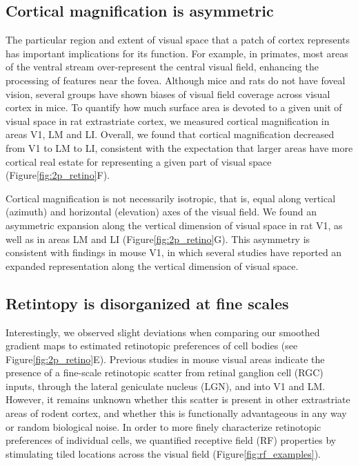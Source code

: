 \subsection{Cortical magnification is asymmetric}
The particular region and extent of visual space that a patch of cortex represents has important implications for its function. For example, in primates, most areas of the ventral stream over-represent the central visual field, enhancing the processing of features near the fovea\cite{REFREF, Gattass2005CorticalDynamics}. Although mice and rats do not have foveal vision, several groups have shown biases of visual field coverage across visual cortex in mice\cite{Garrett2014, Marshel2011, REFREF}. To quantify how much surface area is devoted to a given unit of visual space in rat extrastriate cortex, we measured cortical magnification in areas V1, LM and LI. Overall, we found that cortical magnification decreased from V1 to LM to LI, consistent with the expectation that larger areas have more cortical real estate for representing a given part of visual space (Figure\ref{fig:2p_retino}F). 

Cortical magnification is not necessarily isotropic, that is, equal along vertical (azimuth) and horizontal (elevation) axes of the visual field. We found an asymmetric expansion along the vertical dimension of visual space in rat V1, as well as in areas LM and LI (Figure\ref{fig:2p_retino}G). This asymmetry is consistent with findings in mouse V1, in which several studies have reported an expanded representation along the vertical dimension of visual space\cite{Garrett2014, Liang2018, Bonin2011}.  

\subsection{Retintopy is disorganized at fine scales}
Interestingly, we observed slight deviations when comparing our smoothed gradient maps to estimated retinotopic preferences of cell bodies (see Figure\ref{fig:2p_retino}E). Previous studies in mouse visual areas indicate the presence of a fine-scale retinotopic scatter from retinal ganglion cell (RGC) inputs, through the lateral geniculate nucleus (LGN), and into V1 and LM\cite{Liang2018, Andermann2011, Marques2018}. However, it remains unknown whether this scatter is present in other extrastriate areas of rodent cortex, and whether this is functionally advantageous in any way or random biological noise. In order to more finely characterize retinotopic preferences of individual cells, we quantified receptive field (RF) properties by stimulating tiled locations across the visual field (Figure\ref{fig:rf_examples}). 

